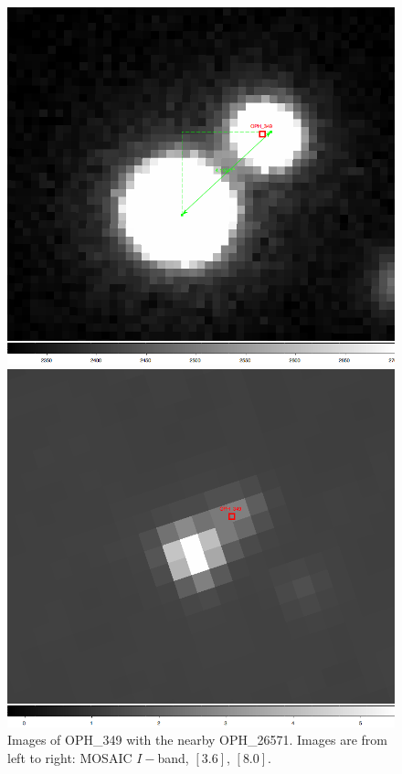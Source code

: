 \begin{figure}[ht!]
  \caption[Images of an edge-on disk source with nearby source]{Images of OPH\_349 with the nearby OPH\_26571.  Images are from left to right: MOSAIC $I-$band, $[3.6]$, $[8.0]$. \label{fig_OPH_349_pair}}
\begin{minipage}[b]{0.3\linewidth}
\centering
\includegraphics[scale=0.15]{chIMACS/figures/OPH_349_I_image}
\end{minipage}
\hspace{0.5cm}
\begin{minipage}[b]{0.3\linewidth}
\centering
\includegraphics[scale=0.15]{chIMACS/figures/OPH_349_IRAC1_image}

\end{minipage}
\end{figure}
